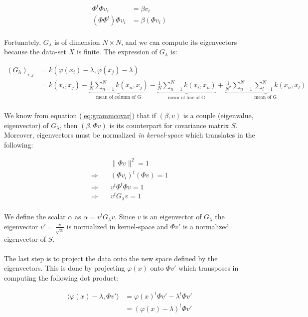 \begin{align}\label{eq:grammcovar}
\Phi^t\Phi v_i &= \beta v_i \\
(\Phi\Phi^t)\Phi v_i &= \beta (\Phi v_i)
\end{align}

\paragraph{} Fortunately, $G_\lambda$ is of dimension $N \times N$, and we can compute its
eigenvectors because the data-set $X$ is finite. The expression of $G_\lambda$ is:

\begin{align*}
(G_\lambda)_{i, j} &= k\left(\varphi(x_i) - \lambda, \varphi(x_j) - \lambda\right) \\
&= k(x_i, x_j) - \underbrace{\frac{1}{N}\sum_{n = 1}^N k(x_n, x_j)}_{\text{mean of column of G}} - \underbrace{\frac{1}{N}\sum_{n = 1}^N k(x_i, x_n)}_{\text{mean of line of G}} + \underbrace{\frac{1}{N^2}\sum_{n = 1}^{N}\sum_{l = 1}^{N} k(x_n, x_l)}_{\text{mean of G}}
\end{align*}

\paragraph{} We know from equation (\ref{eq:grammcovar}) that if $(\beta, v)$ is a couple (eigenvalue, eigenvector) of $G_\lambda$, then $(\beta, \Phi v)$ is its counterpart for covariance matrix
$S$. Moreover, eigenvectors must be normalized \emph{in kernel-space} which translates in the
following:

\begin{align*}
&\| \Phi v \|^2 = 1 \\
\Rightarrow\quad &(\Phi v_i)^t(\Phi v) = 1 \\
\Rightarrow\quad &v^t\Phi^t\Phi v = 1 \\
\Rightarrow\quad &v^t G_\lambda v = 1
\end{align*}

\paragraph{} We define the scalar $\alpha$ as $\alpha = v^t G_\lambda v$. Since $v$ is an eigenvector
of $G_\lambda$ the eigenvector $v' = \frac{v}{\sqrt{\alpha}}$ is normalized in kernel-space and $\Phi
v'$ is a normalized eigenvector of $S$.


\paragraph{} The last step is to project the data onto the new space defined by the eigenvectors.
This is done by projecting $\varphi(x)$ onto $\Phi v'$ which transposes in computing the following
dot product:

\begin{align*}
\langle\varphi(x) - \lambda, \Phi v'\rangle &= \varphi(x)^t\Phi v' - \lambda^t\Phi v' \\
&= (\varphi(x) - \lambda)^t\Phi v'
\end{align*}
